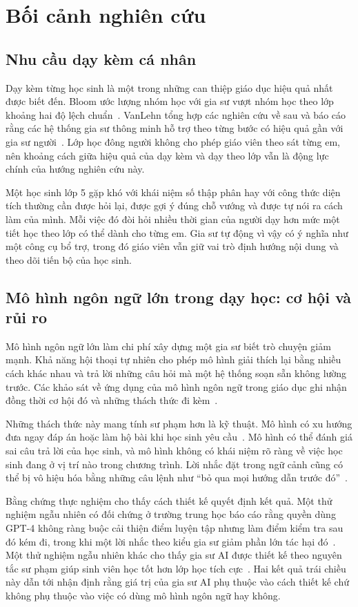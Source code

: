 \section{Bối cảnh nghiên cứu}

\subsection{Nhu cầu dạy kèm cá nhân}
Dạy kèm từng học sinh là một trong những can thiệp giáo dục hiệu quả nhất được biết đến. Bloom ước lượng nhóm học với gia sư vượt nhóm học theo lớp khoảng hai độ lệch chuẩn~\cite{bloom1984}. VanLehn tổng hợp các nghiên cứu về sau và báo cáo rằng các hệ thống gia sư thông minh hỗ trợ theo từng bước có hiệu quả gần với gia sư người~\cite{vanlehn2011}. Lớp học đông người không cho phép giáo viên theo sát từng em, nên khoảng cách giữa hiệu quả của dạy kèm và dạy theo lớp vẫn là động lực chính của hướng nghiên cứu này.

Một học sinh lớp 5 gặp khó với khái niệm số thập phân hay với công thức diện tích thường cần được hỏi lại, được gợi ý đúng chỗ vướng và được tự nói ra cách làm của mình. Mỗi việc đó đòi hỏi nhiều thời gian của người dạy hơn mức một tiết học theo lớp có thể dành cho từng em. Gia sư tự động vì vậy có ý nghĩa như một công cụ bổ trợ, trong đó giáo viên vẫn giữ vai trò định hướng nội dung và theo dõi tiến bộ của học sinh.

\subsection{Mô hình ngôn ngữ lớn trong dạy học: cơ hội và rủi ro}
Mô hình ngôn ngữ lớn làm chi phí xây dựng một gia sư biết trò chuyện giảm mạnh. Khả năng hội thoại tự nhiên cho phép mô hình giải thích lại bằng nhiều cách khác nhau và trả lời những câu hỏi mà một hệ thống soạn sẵn không lường trước. Các khảo sát về ứng dụng của mô hình ngôn ngữ trong giáo dục ghi nhận đồng thời cơ hội đó và những thách thức đi kèm~\cite{kasneci2023}.

Những thách thức này mang tính sư phạm hơn là kỹ thuật. Mô hình có xu hướng đưa ngay đáp án hoặc làm hộ bài khi học sinh yêu cầu~\cite{macina2023,tack2022}. Mô hình có thể đánh giá sai câu trả lời của học sinh, và mô hình không có khái niệm rõ ràng về việc học sinh đang ở vị trí nào trong chương trình. Lời nhắc đặt trong ngữ cảnh cũng có thể bị vô hiệu hóa bằng những câu lệnh như ``bỏ qua mọi hướng dẫn trước đó''~\cite{perez2022}.

Bằng chứng thực nghiệm cho thấy cách thiết kế quyết định kết quả. Một thử nghiệm ngẫu nhiên có đối chứng ở trường trung học báo cáo rằng quyền dùng GPT-4 không ràng buộc cải thiện điểm luyện tập nhưng làm điểm kiểm tra sau đó kém đi, trong khi một lời nhắc theo kiểu gia sư giảm phần lớn tác hại đó~\cite{bastani2025}. Một thử nghiệm ngẫu nhiên khác cho thấy gia sư AI được thiết kế theo nguyên tắc sư phạm giúp sinh viên học tốt hơn lớp học tích cực~\cite{kestin2025}. Hai kết quả trái chiều này dẫn tới nhận định rằng giá trị của gia sư AI phụ thuộc vào cách thiết kế chứ không phụ thuộc vào việc có dùng mô hình ngôn ngữ hay không.

